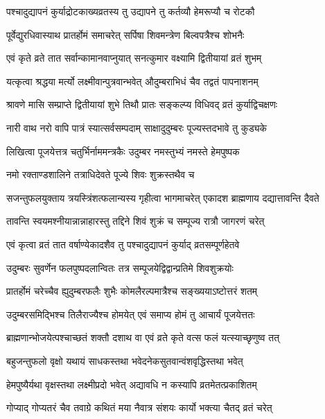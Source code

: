 \twolineshloka
{पश्चादुद्यापनं कुर्याद्रोटकाख्यव्रतस्य तु}
{उद्यापने तु कर्तव्यौ हेमरूप्यौ च रोटकौ} %

\twolineshloka
{पूर्वेद्युरधिवास्याथ प्रातर्होमं समाचरेत्}
{सर्पिषा शिवमन्त्रेण बिल्वपत्रैश्च शोभनैः} %

\twolineshloka
{एवं कृते व्रते तात सर्वान्कामानवाप्नुयात्}
{सनत्कुमार वक्ष्यामि द्वितीयायां व्रतं शुभम्} %

\twolineshloka
{यत्कृत्वा श्रद्धया मर्त्यो लक्ष्मीवान्पुत्रवान्भवेत्}
{औदुम्बराभिधं चैव तद्वतं पापनाशनम्} %

\twolineshloka
{श्रावणे मासि सम्प्राप्ते द्वितीयायां शुभे तिथौ}
{प्रातः सङ्कल्प्य विधिवद् व्रतं कुर्याद्विचक्षणः} %

\twolineshloka
{नारी वाथ नरो वापि पात्रं स्यात्सर्वसम्पदाम्}
{साक्षादुदुम्बरः पूज्यस्तदभावे तु कुड्यके} %

\twolineshloka
{लिखित्वा पूजयेत्तत्र चतुर्भिर्नाममन्त्रकैः}
{उदुम्बर नमस्तुभ्यं नमस्ते हेमपुष्पक} %

\twolineshloka
{नमो रक्ताण्डशालिने}
{तत्राधिदेवते पूज्ये शिवः शुक्रस्तथैव च} %

\twolineshloka
{सजन्तुफलयुक्ताय त्रयस्त्रिंशत्फलान्यस्य गृहीत्वा भागमाचरेत्}
{एकादश ब्राह्मणाय दद्यात्तावन्ति दैवते} %

\twolineshloka
{तावन्ति स्वयमश्नीयान्नान्नाहारस्तु तद्दिने}
{शिवं शुक्रं च सम्पूज्य रात्रौ जागरणं चरेत्} %

\twolineshloka
{एवं कृत्वा व्रतं तात वर्षाण्येकादशैव तु}
{पश्चादुद्यापनं कुर्याद् व्रतसम्पूर्णहेतवे} %

\twolineshloka
{उदुम्बरः सुवर्णेन फलपुष्पदलान्वितः}
{तत्र सम्पूजयेद्विद्वान्प्रतिमे शिवशुक्रयोः} %

\twolineshloka
{प्रातर्होमं चरेच्चैव ह्युदुम्बरफलैः शुभैः}
{कोमलैरल्पमात्रैश्च सङ्ख्ययाऽष्टोत्तरं शतम्} %

\twolineshloka
{उदुम्बरसमिद्भिश्च तिलैराज्यैश्च होमयेत्}
{एवं समाप्य होमं तु आचार्यं पूजयेत्ततः} %

\twolineshloka
{ब्राह्मणान्भोजयेत्पश्चाच्छतं शक्तौ दशाथ वा}
{एवं व्रते कृते वत्स फलं यत्स्याच्छृणुष्व तत्} %

\twolineshloka
{बहुजन्तुफलो वृक्षो यथायं साधकस्तथा}
{भवेदनेकसुतवान्वंशवृद्धिस्तथा भवेत्} %

\twolineshloka
{हेमपुष्यैर्यथा वृक्षस्तथा लक्ष्मीप्रदो भवेत्}
{अद्यावधि न कस्यापि व्रतमेतत्प्रकाशितम्} %

\twolineshloka
{गोप्याद् गोप्यतरं चैव तवाग्रे कथितं मया}
{नैवात्र संशयः कार्यो भक्त्या चैतद् व्रतं चरेत्} %


